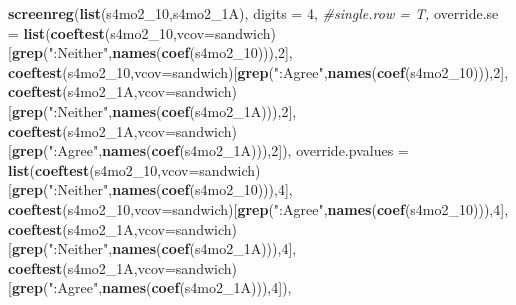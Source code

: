 \documentclass[
]{article}
\newenvironment{Shaded}{\begin{snugshade}}{\end{snugshade}}
\newcommand{\CommentTok}[1]{\textcolor[rgb]{0.56,0.35,0.01}{\textit{#1}}}
\newcommand{\DataTypeTok}[1]{\textcolor[rgb]{0.13,0.29,0.53}{#1}}
\newcommand{\DecValTok}[1]{\textcolor[rgb]{0.00,0.00,0.81}{#1}}
\newcommand{\KeywordTok}[1]{\textcolor[rgb]{0.13,0.29,0.53}{\textbf{#1}}}
\newcommand{\NormalTok}[1]{#1}
\newcommand{\StringTok}[1]{\textcolor[rgb]{0.31,0.60,0.02}{#1}}
\begin{document}
\begin{Shaded}
\begin{Highlighting}[]
\KeywordTok{screenreg}\NormalTok{(}\KeywordTok{list}\NormalTok{(s4mo2_}\DecValTok{10}\NormalTok{,s4mo2_1A), }\DataTypeTok{digits =} \DecValTok{4}\NormalTok{, }\CommentTok{#single.row = T,}
          \DataTypeTok{override.se =} \KeywordTok{list}\NormalTok{(}\KeywordTok{coeftest}\NormalTok{(s4mo2_}\DecValTok{10}\NormalTok{,}\DataTypeTok{vcov=}\NormalTok{sandwich)[}\KeywordTok{grep}\NormalTok{(}\StringTok{":Neither"}\NormalTok{,}\KeywordTok{names}\NormalTok{(}\KeywordTok{coef}\NormalTok{(s4mo2_}\DecValTok{10}\NormalTok{))),}\DecValTok{2}\NormalTok{],}
                             \KeywordTok{coeftest}\NormalTok{(s4mo2_}\DecValTok{10}\NormalTok{,}\DataTypeTok{vcov=}\NormalTok{sandwich)[}\KeywordTok{grep}\NormalTok{(}\StringTok{":Agree"}\NormalTok{,}\KeywordTok{names}\NormalTok{(}\KeywordTok{coef}\NormalTok{(s4mo2_}\DecValTok{10}\NormalTok{))),}\DecValTok{2}\NormalTok{],}
                             \KeywordTok{coeftest}\NormalTok{(s4mo2_1A,}\DataTypeTok{vcov=}\NormalTok{sandwich)[}\KeywordTok{grep}\NormalTok{(}\StringTok{":Neither"}\NormalTok{,}\KeywordTok{names}\NormalTok{(}\KeywordTok{coef}\NormalTok{(s4mo2_1A))),}\DecValTok{2}\NormalTok{],}
                             \KeywordTok{coeftest}\NormalTok{(s4mo2_1A,}\DataTypeTok{vcov=}\NormalTok{sandwich)[}\KeywordTok{grep}\NormalTok{(}\StringTok{":Agree"}\NormalTok{,}\KeywordTok{names}\NormalTok{(}\KeywordTok{coef}\NormalTok{(s4mo2_1A))),}\DecValTok{2}\NormalTok{]),}
          \DataTypeTok{override.pvalues =} \KeywordTok{list}\NormalTok{(}\KeywordTok{coeftest}\NormalTok{(s4mo2_}\DecValTok{10}\NormalTok{,}\DataTypeTok{vcov=}\NormalTok{sandwich)[}\KeywordTok{grep}\NormalTok{(}\StringTok{":Neither"}\NormalTok{,}\KeywordTok{names}\NormalTok{(}\KeywordTok{coef}\NormalTok{(s4mo2_}\DecValTok{10}\NormalTok{))),}\DecValTok{4}\NormalTok{],}
                                  \KeywordTok{coeftest}\NormalTok{(s4mo2_}\DecValTok{10}\NormalTok{,}\DataTypeTok{vcov=}\NormalTok{sandwich)[}\KeywordTok{grep}\NormalTok{(}\StringTok{":Agree"}\NormalTok{,}\KeywordTok{names}\NormalTok{(}\KeywordTok{coef}\NormalTok{(s4mo2_}\DecValTok{10}\NormalTok{))),}\DecValTok{4}\NormalTok{],}
                                  \KeywordTok{coeftest}\NormalTok{(s4mo2_1A,}\DataTypeTok{vcov=}\NormalTok{sandwich)[}\KeywordTok{grep}\NormalTok{(}\StringTok{":Neither"}\NormalTok{,}\KeywordTok{names}\NormalTok{(}\KeywordTok{coef}\NormalTok{(s4mo2_1A))),}\DecValTok{4}\NormalTok{],}
                                  \KeywordTok{coeftest}\NormalTok{(s4mo2_1A,}\DataTypeTok{vcov=}\NormalTok{sandwich)[}\KeywordTok{grep}\NormalTok{(}\StringTok{":Agree"}\NormalTok{,}\KeywordTok{names}\NormalTok{(}\KeywordTok{coef}\NormalTok{(s4mo2_1A))),}\DecValTok{4}\NormalTok{]),}

\end{Highlighting}
\end{Shaded}
\end{document}
